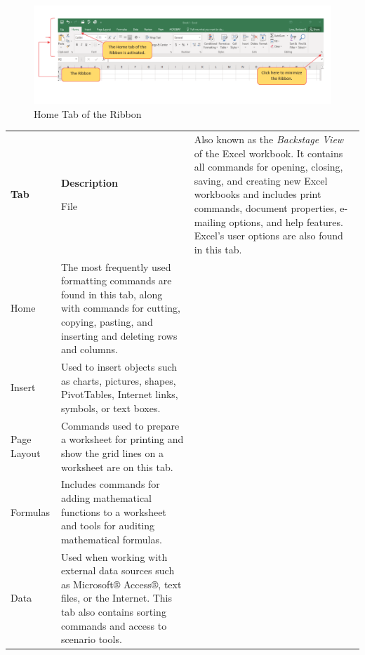 \begin{figure}[H]
	\centering
	\includegraphics[width=\maxwidth{.95\linewidth}]{gfx/ch01_fig06}
	\caption{Home Tab of the Ribbon}
	\label{01:fig06}
\end{figure}

\begin{table}[H]
	{\small
		\begin{longtable}{L{0.75in}L{3.50in}} %
			\textbf{Tab} & \textbf{Description} \endhead
			\hline

			File & Also known as the \textit{Backstage View} of the Excel workbook. It contains all commands for opening, closing, saving, and creating new Excel workbooks and includes print commands, document properties, e-mailing options, and help features. Excel's user options are also found in this tab.\\

			Home & The most frequently used formatting commands are found in this tab, along with commands for cutting, copying, pasting, and inserting and deleting rows and columns.\\
			
			Insert & Used to insert objects such as charts, pictures, shapes, PivotTables, Internet links, symbols, or text boxes.\\
			
			Page Layout & Commands used to prepare a worksheet for printing and show the grid lines on a worksheet are on this tab.\\
			
			Formulas & Includes commands for adding mathematical functions to a worksheet and tools for auditing mathematical formulas.\\
			
			Data & Used when working with external data sources such as Microsoft® Access®, text files, or the Internet. This tab also contains sorting commands and access to scenario tools.\\
			

\end{longtable}}
\end{table}
